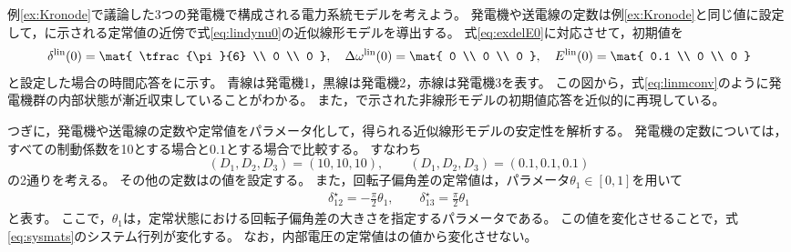 \documentclass[tombow,dvipdfmx]{corona-a5-1.1}
\begin{document}
\begin{例}[近似線形モデルの数値的な安定性解析]\label{ex:linsyssim}
例\ref{ex:Kronode}で議論した3つの発電機で構成される電力系統モデルを考えよう。
発電機や送電線の定数は例\ref{ex:Kronode}と同じ値に設定して，に示される定常値の近傍で式\ref{eq:lindynu0}の近似線形モデルを導出する。
式\ref{eq:exdelE0}に対応させて，初期値を
\begin{align}\label{eq:linmini}
\delta^{\rm lin}(0)
 =
\mat{
\tfrac{\pi}{6} \\
0 \\
0
},\quad
\Delta \omega^{\rm lin}(0)
 =
\mat{
0 \\
0 \\
0
},\quad
E^{\rm lin}(0)
 =
\mat{
0.1 \\
0 \\
0
}
\end{align}
と設定した場合の時間応答をに示す。
青線は発電機1，黒線は発電機2，赤線は発電機3を表す。
この図から，式\ref{eq:linmconv}のように発電機群の内部状態が漸近収束していることがわかる。
また，で示された非線形モデルの初期値応答を近似的に再現している。


つぎに，発電機や送電線の定数や定常値をパラメータ化して，得られる近似線形モデルの安定性を解析する。
発電機の定数については，すべての制動係数を10とする場合と$0.1$とする場合で比較する。
すなわち
\[
(D_1,D_2,D_3)= (10,10,10), \qquad
(D_1,D_2,D_3)= \left(0.1,0.1,0.1\right)
\]
の2通りを考える。
その他の定数はの値を設定する。
また，回転子偏角差の定常値は，パラメータ$\theta_1 \in [0, 1]$を用いて
\begin{align}
\delta_{12}^{\star}= - \frac{\pi}{2} \theta_1
,\qquad
\delta_{13}^{\star}=  \frac{\pi}{2} \theta_1
\end{align}
と表す。
ここで，$\theta_1$は，定常状態における回転子偏角差の大きさを指定するパラメータである。
この値を変化させることで，式\ref{eq:sysmats}のシステム行列が変化する。
なお，内部電圧の定常値はの値から変化させない。


\end{例}
\end{document}
